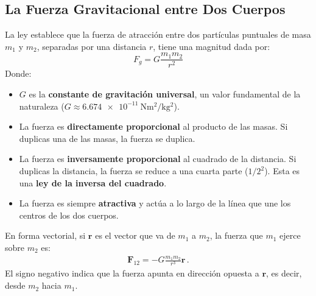 \documentclass[11pt,a4paper]{book}
\begin{document}
\subsection{La Fuerza Gravitacional entre Dos Cuerpos}

La ley establece que la fuerza de atracción entre dos partículas puntuales de masa $m_1$ y $m_2$, separadas por una distancia $r$, tiene una magnitud dada por:
\begin{equation}
    F_g = G \frac{m_1 m_2}{r^2}
    \label{eq:ley_gravitacion}
\end{equation}
Donde:
\begin{itemize}
    \item \textbf{$G$} es la \textbf{constante de gravitación universal}, un valor fundamental de la naturaleza ($G \approx \SI{6.674e-11}{\newton\meter\squared\per\kilo\gram\squared}$).
    \item La fuerza es \textbf{directamente proporcional} al producto de las masas. Si duplicas una de las masas, la fuerza se duplica.
    \item La fuerza es \textbf{inversamente proporcional} al cuadrado de la distancia. Si duplicas la distancia, la fuerza se reduce a una cuarta parte ($1/2^2$). Esta es una \textbf{ley de la inversa del cuadrado}.
    \item La fuerza es siempre \textbf{atractiva} y actúa a lo largo de la línea que une los centros de los dos cuerpos.
\end{itemize}

En forma vectorial, si $\boldsymbol{r}$ es el vector que va de $m_1$ a $m_2$, la fuerza que $m_1$ ejerce sobre $m_2$ es:
\begin{align}
\label{eq:GravitationalForce}
    \boldsymbol{F}_{12} = -G \frac{m_1 m_2}{r^3} \boldsymbol{r}\,.
\end{align}
El signo negativo indica que la fuerza apunta en dirección opuesta a $\boldsymbol{r}$, es decir, desde $m_2$ hacia $m_1$.



\end{document}
